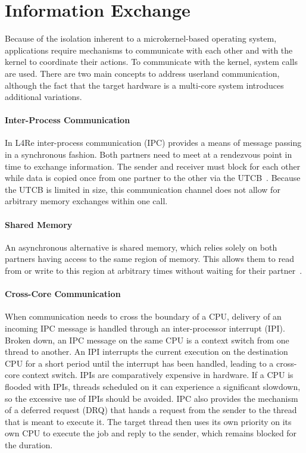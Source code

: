 \section{Information Exchange}

Because of the isolation inherent to a microkernel-based operating system, applications require mechanisms to communicate with each other and with the kernel to coordinate their actions.
To communicate with the kernel, system calls are used.
There are two main concepts to address userland communication, although the fact that the target hardware is a multi-core system introduces additional variations.

\paragraph{Inter-Process Communication}
\label{sec:ipc}

In L4Re inter-process communication (IPC) provides a means of message passing in a synchronous fashion.
Both partners need to meet at a rendezvous point in time to exchange information.
The sender and receiver must block for each other while data is copied once from one partner to the other via the UTCB~\cite{IPCMOSlecture}.
Because the UTCB is limited in size, this communication channel does not allow for arbitrary memory exchanges within one call.

\paragraph{Shared Memory}

An asynchronous alternative is shared memory, which relies solely on both partners having access to the same region of memory.
This allows them to read from or write to this region at arbitrary times without waiting for their partner~\cite{IPCMOSlecture}.

\paragraph{Cross-Core Communication}
\label{sec:cross-comm}

When communication needs to cross the boundary of a CPU, delivery of an incoming IPC message is handled through an inter-processor interrupt (IPI).
Broken down, an IPC message on the same CPU is a context switch from one thread to another.
An IPI interrupts the current execution on the destination CPU for a short period until the interrupt has been handled, leading to a cross-core context switch.
IPIs are comparatively expensive in hardware.
If a CPU is flooded with IPIs, threads scheduled on it can experience a significant slowdown, so the excessive use of IPIs should be avoided.
IPC also provides the mechanism of a deferred request (DRQ) that hands a request from the sender to the thread that is meant to execute it.
The target thread then uses its own priority on its own CPU to execute the job and reply to the sender, which remains blocked for the duration.

